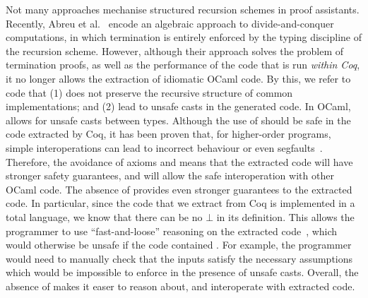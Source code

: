 \documentclass[ a4paper, UKenglish, cleveref, autoref, thm-restate]{lipics-v2021}
\begin{document}
Not many approaches mechanise structured recursion
schemes in proof assistants.  Recently, Abreu et al.~\cite{AbreuDHJMS23} encode
an algebraic approach to divide-and-conquer computations, in which termination
is entirely enforced by the typing discipline of the recursion scheme. However,
although their approach solves the problem of termination proofs, as well as
the performance of the code that is run \emph{within Coq}, it no longer allows
the extraction of idiomatic OCaml code.  By this, we refer to code
that (1) does not preserve the recursive structure of common implementations;
and (2) lead to unsafe casts  in the generated code. 
In OCaml,  allows for unsafe casts between types.
Although the use of  should be safe in the code
extracted by Coq, it has been proven that, for higher-order programs, simple
interoperations can lead to incorrect behaviour or even
segfaults~\cite{forster:hal-04329663}. Therefore, the avoidance of axioms and
 means that the extracted code will have stronger
safety guarantees, and will allow the safe interoperation with other OCaml
code. The absence of  provides even stronger guarantees to the
extracted code. In particular, since the code that we extract from Coq is
implemented in a total language, we know that there can be no $\bot$ in its
definition. This allows the programmer to use ``fast-and-loose'' reasoning on
the extracted code~\cite{DanielssonHJG06}, which would otherwise be unsafe if
the code contained . For example, the programmer would need to
manually check that the inputs satisfy the necessary assumptions which would be
impossible to enforce in the presence of unsafe casts. Overall, the absence of
 makes it easer to reason about, and interoperate with
extracted code. 
\end{document}
